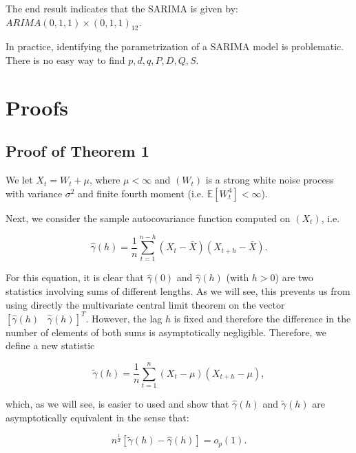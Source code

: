 \documentclass[]{book}
\theoremstyle{definition}
\theoremstyle{definition}
\theoremstyle{definition}
\theoremstyle{remark}
\begin{document}
{The end result indicates that the SARIMA is given by:
\(ARIMA(0,1,1)\times(0,1,1)_{12}\).

In practice, identifying the parametrization of a SARIMA model is
problematic. There is no easy way to find \(p, d, q, P, D, Q, S\).

\hypertarget{appendix-appendix}{%
\appendix}


\hypertarget{appendixa}{%
\chapter{Proofs}\label{appendixa}}

\hypertarget{proof-of-theorem-1}{%
\section{Proof of Theorem 1}\label{proof-of-theorem-1}}

We let \(X_t = W_t + \mu\), where \(\mu < \infty\) and \((W_t)\) is a
strong white noise process with variance \(\sigma^2\) and finite fourth
moment (i.e. \(\mathbb{E} [W_t^4] < \infty\)).

Next, we consider the sample autocovariance function computed on
\((X_t)\), i.e.

\[
\hat \gamma \left( h \right) = \frac{1}{n}\sum\limits_{t = 1}^{n - h} {\left( {{X_t} - \bar X} \right)\left( {{X_{t + h}} - \bar X} \right)}.
\]

For this equation, it is clear that \(\hat \gamma \left( 0 \right)\) and
\(\hat \gamma \left( h \right)\) (with \(h > 0\)) are two statistics
involving sums of different lengths. As we will see, this prevents us
from using directly the multivariate central limit theorem on the vector
\([ \hat \gamma \left( h \right) \;\;\; \hat \gamma \left( h \right) ]^T\).
However, the lag \(h\) is fixed and therefore the difference in the
number of elements of both sums is asymptotically negligible. Therefore,
we define a new statistic

\[\tilde{\gamma} \left( h \right) = \frac{1}{n}\sum\limits_{t = 1}^{n} {\left( {{X_t} - \mu} \right)\left( {{X_{t + h}} - \mu} \right)},
\]

which, as we will see, is easier to used and show that
\(\hat \gamma \left( h \right)\) and \(\tilde{\gamma} \left( h \right)\)
are asymptotically equivalent in the sense that:

\[
n^{\frac{1}{2}}[\tilde{\gamma} \left( h \right) - \hat \gamma \left( h \right)] = o_p(1).
\]

}
\end{document}
